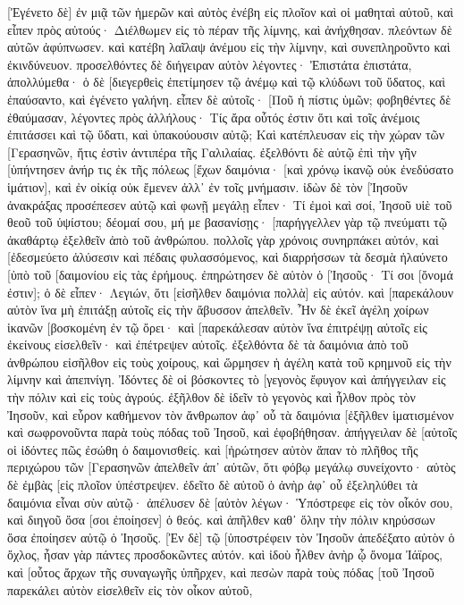 [Ἐγένετο δὲ] ἐν μιᾷ τῶν ἡμερῶν καὶ αὐτὸς ἐνέβη εἰς πλοῖον καὶ οἱ μαθηταὶ αὐτοῦ, καὶ εἶπεν πρὸς αὐτούς· Διέλθωμεν εἰς τὸ πέραν τῆς λίμνης, καὶ ἀνήχθησαν. 
πλεόντων δὲ αὐτῶν ἀφύπνωσεν. καὶ κατέβη λαῖλαψ ἀνέμου εἰς τὴν λίμνην, καὶ συνεπληροῦντο καὶ ἐκινδύνευον. 
προσελθόντες δὲ διήγειραν αὐτὸν λέγοντες· Ἐπιστάτα ἐπιστάτα, ἀπολλύμεθα· ὁ δὲ [διεγερθεὶς ἐπετίμησεν τῷ ἀνέμῳ καὶ τῷ κλύδωνι τοῦ ὕδατος, καὶ ἐπαύσαντο, καὶ ἐγένετο γαλήνη. 
εἶπεν δὲ αὐτοῖς· [Ποῦ ἡ πίστις ὑμῶν; φοβηθέντες δὲ ἐθαύμασαν, λέγοντες πρὸς ἀλλήλους· Τίς ἄρα οὗτός ἐστιν ὅτι καὶ τοῖς ἀνέμοις ἐπιτάσσει καὶ τῷ ὕδατι, καὶ ὑπακούουσιν αὐτῷ; 
Καὶ κατέπλευσαν εἰς τὴν χώραν τῶν [Γερασηνῶν, ἥτις ἐστὶν ἀντιπέρα τῆς Γαλιλαίας. 
ἐξελθόντι δὲ αὐτῷ ἐπὶ τὴν γῆν [ὑπήντησεν ἀνήρ τις ἐκ τῆς πόλεως [ἔχων δαιμόνια· [καὶ χρόνῳ ἱκανῷ οὐκ ἐνεδύσατο ἱμάτιον], καὶ ἐν οἰκίᾳ οὐκ ἔμενεν ἀλλ᾽ ἐν τοῖς μνήμασιν. 
ἰδὼν δὲ τὸν [Ἰησοῦν ἀνακράξας προσέπεσεν αὐτῷ καὶ φωνῇ μεγάλῃ εἶπεν· Τί ἐμοὶ καὶ σοί, Ἰησοῦ υἱὲ τοῦ θεοῦ τοῦ ὑψίστου; δέομαί σου, μή με βασανίσῃς· 
[παρήγγελλεν γὰρ τῷ πνεύματι τῷ ἀκαθάρτῳ ἐξελθεῖν ἀπὸ τοῦ ἀνθρώπου. πολλοῖς γὰρ χρόνοις συνηρπάκει αὐτόν, καὶ [ἐδεσμεύετο ἁλύσεσιν καὶ πέδαις φυλασσόμενος, καὶ διαρρήσσων τὰ δεσμὰ ἠλαύνετο [ὑπὸ τοῦ [δαιμονίου εἰς τὰς ἐρήμους. 
ἐπηρώτησεν δὲ αὐτὸν ὁ [Ἰησοῦς· Τί σοι [ὄνομά ἐστιν]; ὁ δὲ εἶπεν· Λεγιών, ὅτι [εἰσῆλθεν δαιμόνια πολλὰ] εἰς αὐτόν. 
καὶ [παρεκάλουν αὐτὸν ἵνα μὴ ἐπιτάξῃ αὐτοῖς εἰς τὴν ἄβυσσον ἀπελθεῖν. 
Ἦν δὲ ἐκεῖ ἀγέλη χοίρων ἱκανῶν [βοσκομένη ἐν τῷ ὄρει· καὶ [παρεκάλεσαν αὐτὸν ἵνα ἐπιτρέψῃ αὐτοῖς εἰς ἐκείνους εἰσελθεῖν· καὶ ἐπέτρεψεν αὐτοῖς. 
ἐξελθόντα δὲ τὰ δαιμόνια ἀπὸ τοῦ ἀνθρώπου εἰσῆλθον εἰς τοὺς χοίρους, καὶ ὥρμησεν ἡ ἀγέλη κατὰ τοῦ κρημνοῦ εἰς τὴν λίμνην καὶ ἀπεπνίγη. 
Ἰδόντες δὲ οἱ βόσκοντες τὸ [γεγονὸς ἔφυγον καὶ ἀπήγγειλαν εἰς τὴν πόλιν καὶ εἰς τοὺς ἀγρούς. 
ἐξῆλθον δὲ ἰδεῖν τὸ γεγονὸς καὶ ἦλθον πρὸς τὸν Ἰησοῦν, καὶ εὗρον καθήμενον τὸν ἄνθρωπον ἀφ᾽ οὗ τὰ δαιμόνια [ἐξῆλθεν ἱματισμένον καὶ σωφρονοῦντα παρὰ τοὺς πόδας τοῦ Ἰησοῦ, καὶ ἐφοβήθησαν. 
ἀπήγγειλαν δὲ [αὐτοῖς οἱ ἰδόντες πῶς ἐσώθη ὁ δαιμονισθείς. 
καὶ [ἠρώτησεν αὐτὸν ἅπαν τὸ πλῆθος τῆς περιχώρου τῶν [Γερασηνῶν ἀπελθεῖν ἀπ᾽ αὐτῶν, ὅτι φόβῳ μεγάλῳ συνείχοντο· αὐτὸς δὲ ἐμβὰς [εἰς πλοῖον ὑπέστρεψεν. 
ἐδεῖτο δὲ αὐτοῦ ὁ ἀνὴρ ἀφ᾽ οὗ ἐξεληλύθει τὰ δαιμόνια εἶναι σὺν αὐτῷ· ἀπέλυσεν δὲ [αὐτὸν λέγων· 
Ὑπόστρεφε εἰς τὸν οἶκόν σου, καὶ διηγοῦ ὅσα [σοι ἐποίησεν] ὁ θεός. καὶ ἀπῆλθεν καθ᾽ ὅλην τὴν πόλιν κηρύσσων ὅσα ἐποίησεν αὐτῷ ὁ Ἰησοῦς. 
[Ἐν δὲ] τῷ [ὑποστρέφειν τὸν Ἰησοῦν ἀπεδέξατο αὐτὸν ὁ ὄχλος, ἦσαν γὰρ πάντες προσδοκῶντες αὐτόν. 
καὶ ἰδοὺ ἦλθεν ἀνὴρ ᾧ ὄνομα Ἰάϊρος, καὶ [οὗτος ἄρχων τῆς συναγωγῆς ὑπῆρχεν, καὶ πεσὼν παρὰ τοὺς πόδας [τοῦ Ἰησοῦ παρεκάλει αὐτὸν εἰσελθεῖν εἰς τὸν οἶκον αὐτοῦ, 
